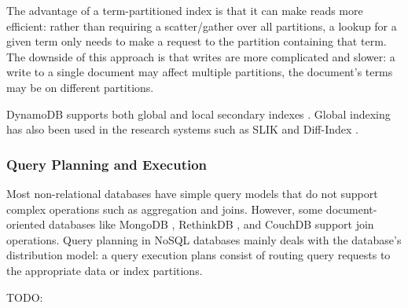 The advantage of a term-partitioned index is that it can make reads more efficient:
rather than requiring a scatter/gather over all partitions, a lookup for a given term only needs to make a request to the
partition containing that term.
The downside of this approach is that writes are more complicated and slower:
a write to a single document may affect multiple partitions, the document's terms may be on different partitions.

DynamoDB supports both global and local secondary indexes \cite{dynamodb:secondaryindexes}.
Global indexing has also been used in the research systems such as SLIK \cite{kejriwal:slik} and Diff-Index \cite{tan:diffindex}.

\subsubsection{Query Planning and Execution}

Most non-relational databases have simple query models that do not support complex operations such as aggregation and
joins.
However, some document-oriented databases like MongoDB \cite{mongodb:joins}, RethinkDB \cite{rethinkdb:joins}, and CouchDB \cite{couchdb:joins} support join operations.
Query planning in NoSQL databases mainly deals with the database's distribution model:
a query execution plans consist of routing query requests to the appropriate data or index partitions.

TODO:


